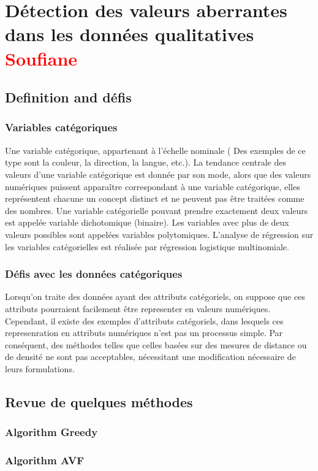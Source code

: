 \section{Détection des valeurs aberrantes dans les données qualitatives \\ 
 \textcolor{red}{Soufiane} }
%
\subsection{Definition and défis}
%

\subsubsection{Variables catégoriques}
Une variable catégorique, appartenant à l’échelle nominale  ( Des exemples de ce type sont la couleur, la direction, la langue, etc.). 
La tendance centrale des valeurs d'une variable catégorique est donnée par son mode, alors que des valeurs numériques puissent apparaître correspondant à une variable catégorique, elles représentent chacune un concept distinct et ne peuvent pas être traitées comme des nombres. 
Une variable catégorielle pouvant prendre exactement deux valeurs est appelée variable dichotomique (binaire). Les variables avec plus de deux valeurs possibles sont appelées variables polytomiques. L'analyse de régression sur les variables catégorielles est réalisée par régression logistique multinomiale.



\subsubsection{Défis avec les données catégoriques}
Lorsqu'on traite des données ayant des attributs catégoriels, on suppose que ces attributs  pourraient facilement être representer en valeurs numériques. Cependant, il existe des exemples d'attributs catégoriels, dans lesquels ces represenration en attributs numériques n'est pas un processus simple. Par conséquent, des méthodes telles que celles basées sur des mesures de distance ou de densité ne sont pas acceptables, nécessitant une modification nécessaire de leurs formulations.

\subsection{Revue de quelques méthodes}

\subsubsection{Algorithm Greedy}



\subsubsection{Algorithm AVF}


